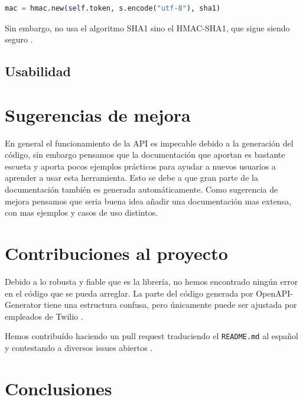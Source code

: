 \documentclass{article}
\begin{document}
\begin{lstlisting}[language=Python]
mac = hmac.new(self.token, s.encode("utf-8"), sha1)
\end{lstlisting}

Sin embargo, no usa el algoritmo SHA1
sino el HMAC-SHA1, que sigue siendo seguro \cite{hmac-sha1}.

\subsection{Usabilidad}

\section{Sugerencias de mejora}
En general el funcionamiento de la API es impecable debido a la generación del código, sin embargo pensamos que la documentación que aportan es bastante escueta y aporta pocos ejemplos prácticos para ayudar a nuevos usuarios a aprender a usar esta herramienta. Esto se debe a que gran parte de la documentación también es generada automáticamente.
Como sugerencia de mejora pensamos que seria buena idea añadir una documentación mas extensa, con mas ejemplos y casos de uso distintos.

\section{Contribuciones al proyecto}

Debido a lo robusta y fiable que es la librería,
no hemos encontrado ningún error en el código que se pueda arreglar.
La parte del código generada por OpenAPI-Generator
tiene una estructura confusa,
pero únicamente puede ser ajustada por empleados de Twilio \cite{contributing}.

Hemos contribuído haciendo un pull request
traduciendo el \verb|README.md| al español
\cite{contribución-readme}
y contestando a diversos issues abiertos
\cite{contribución-repeated-code}
\cite{contribución-security-improvements}
\cite{contribución-wrong-login}.

\section{Conclusiones}
\end{document}
